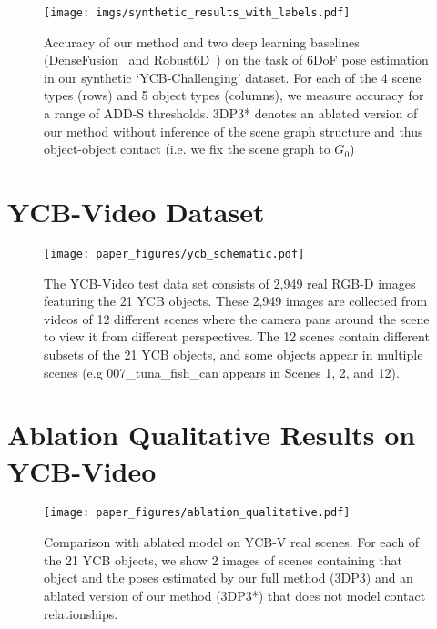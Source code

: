 \begin{figure}[h!]
	\centering
	\texttt{[image: imgs/synthetic\_results\_with\_labels.pdf]}
	\caption{Accuracy of our method and two deep learning baselines (DenseFusion~\cite{wang2019densefusion} and Robust6D~\cite{tian2020robust}) on the task of 6DoF pose estimation in our synthetic `YCB-Challenging' dataset.
		For each of the 4 scene types (rows) and 5 object types (columns), we measure accuracy for a range of ADD-S thresholds.
		3DP3* denotes an ablated version of our method without inference of the scene graph structure and thus object-object contact (i.e. we fix the scene graph to $G_0$)}
	
	\label{fig:synthetic_accuracy}
\end{figure}



\section{YCB-Video Dataset}


\begin{figure}[h!]
	\centering
	\texttt{[image: paper\_figures/ycb\_schematic.pdf]}
	\caption{The YCB-Video \cite{calli2015benchmarking} test data set consists of 2,949 real RGB-D images featuring the 21 YCB objects. These 2,949 images are collected from videos of 12 different scenes where the camera pans around the scene to view it from different perspectives.  The 12 scenes contain different subsets of the 21 YCB objects, and some objects appear in multiple scenes (e.g 007\_tuna\_fish\_can appears in Scenes 1, 2, and 12).}
	\label{fig:ycb_schematic}
\end{figure}


\section{Ablation Qualitative Results on YCB-Video}

\begin{figure}[hp]
	\centering
	\texttt{[image: paper\_figures/ablation\_qualitative.pdf]}
	\caption{Comparison with ablated model on YCB-V real scenes. For each of the 21 YCB objects, we show 2 images of scenes containing that object and the poses estimated by our full method (3DP3) and an ablated version of our method (3DP3*) that does not model contact relationships.}
	\label{fig:ycb_ablation_qualitative}
\end{figure}



